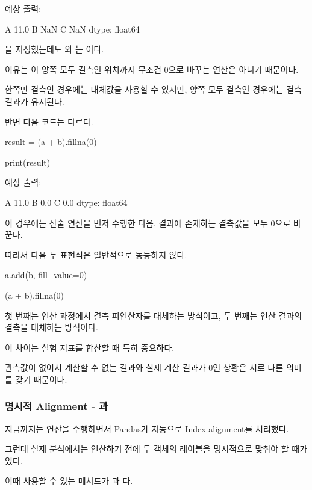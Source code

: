 예상 출력:

\begin{dhkzsh}
A    11.0
B     NaN
C     NaN
dtype: float64
\end{dhkzsh}

을 지정했는데도 와 는 이다.

이유는 이 양쪽 모두 결측인 위치까지 무조건 0으로 바꾸는 연산은 아니기 때문이다.

한쪽만 결측인 경우에는 대체값을 사용할 수 있지만, 양쪽 모두 결측인 경우에는 결측 결과가 유지된다.

반면 다음 코드는 다르다.

\begin{dhkcode}
result = (a + b).fillna(0)

print(result)
\end{dhkcode}

예상 출력:

\begin{dhkzsh}
A    11.0
B     0.0
C     0.0
dtype: float64
\end{dhkzsh}

이 경우에는 산술 연산을 먼저 수행한 다음, 결과에 존재하는 결측값을 모두 0으로 바꾼다.

따라서 다음 두 표현식은 일반적으로 동등하지 않다.

\begin{dhkcode}
a.add(b, fill_value=0)

(a + b).fillna(0)
\end{dhkcode}

첫 번째는 연산 과정에서 결측 피연산자를 대체하는 방식이고, 두 번째는 연산 결과의 결측을 대체하는 방식이다.

이 차이는 실험 지표를 합산할 때 특히 중요하다.

관측값이 없어서 계산할 수 없는 결과와 실제 계산 결과가 0인 상황은 서로 다른 의미를 갖기 때문이다.

\subsubsection{명시적 Alignment - 과 }

지금까지는 \zsh{+} 연산을 수행하면서 Pandas가 자동으로 Index alignment를 처리했다.

그런데 실제 분석에서는 연산하기 전에 두 객체의 레이블을 명시적으로 맞춰야 할 때가 있다.

이때 사용할 수 있는 메서드가 과 다.


